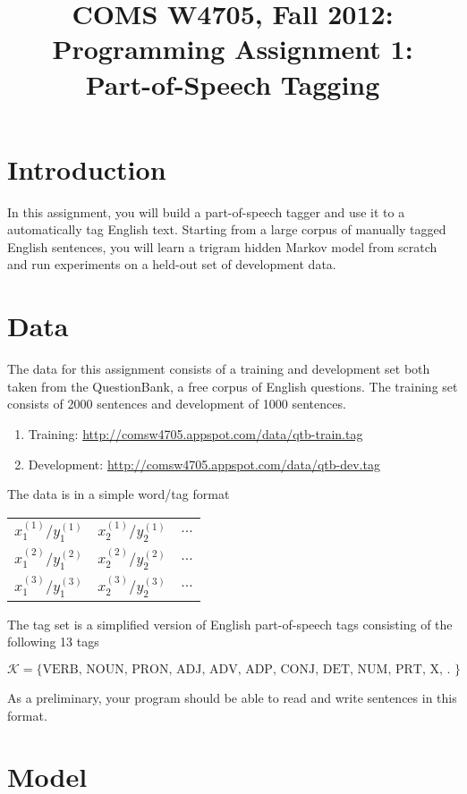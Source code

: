 \documentclass{article}
\title{COMS W4705, Fall 2012: \\ Programming Assignment 1: \\ Part-of-Speech Tagging}
\date{}
\begin{document}
\maketitle{}


\section{Introduction}

In this assignment, you will build a part-of-speech tagger and use it to a automatically tag English text. Starting from a large corpus of manually tagged English sentences, you will learn a trigram hidden Markov model from scratch and run experiments on a held-out set of development data.

\section{Data}

The data for this assignment consists of a training and development set both taken from the QuestionBank, a free corpus of English questions. The training set consists of 2000 sentences and development of 1000 sentences.

\begin{enumerate}
  \item Training:  \url{http://comsw4705.appspot.com/data/qtb-train.tag}
  \item Development: \url{http://comsw4705.appspot.com/data/qtb-dev.tag}
\end{enumerate}

The data is in a simple word/tag format

\begin{tabular}{ccc}
$x^{(1)}_1/y^{(1)}_1$ & $x^{(1)}_2/y^{(1)}_2$ & $\ldots$ \\
$x^{(2)}_1/y^{(2)}_1$ & $x^{(2)}_2/y^{(2)}_2$ & $\ldots$ \\
$x^{(3)}_1/y^{(3)}_1$ & $x^{(3)}_2/y^{(3)}_2$ & $\ldots$ \\
\end{tabular}

The tag set is a simplified version of English part-of-speech tags consisting of the following 13 tags

\[
\mathcal{K} = \{\mbox{VERB, NOUN, PRON, ADJ, ADV, ADP, CONJ, DET, NUM, PRT, X, . }\}
\]

As a preliminary, your program should be able to read and write sentences in this format.

\section{Model}
\end{document}
